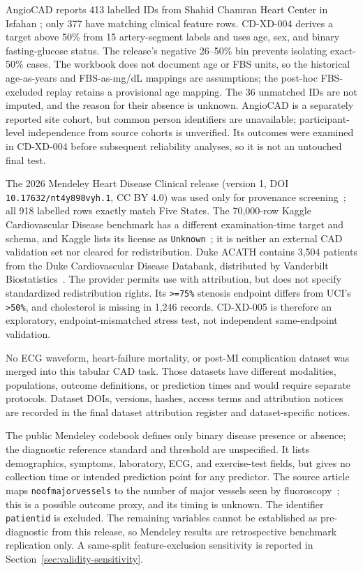 \documentclass[journal]{IEEEtran}
\begin{document}
AngioCAD reports 413 labelled IDs from Shahid Chamran Heart Center in Isfahan
\cite{angiocad2026,angiocadzenodo2025}; only 377 have matching clinical
feature rows. CD-XD-004 derives a target above 50\% from 15 artery-segment
labels and uses age, sex, and binary fasting-glucose status. The release's
negative 26--50\% bin prevents isolating exact-50\% cases. The workbook does
not document age or FBS units, so the historical age-as-years and FBS-as-mg/dL
mappings are assumptions; the post-hoc FBS-excluded replay retains a
provisional age mapping. The 36 unmatched IDs are not imputed, and the reason
for their absence is unknown. AngioCAD is a separately reported site cohort,
but common person identifiers are unavailable; participant-level
independence from source cohorts is unverified. Its outcomes were examined in
CD-XD-004 before subsequent reliability analyses, so it is not an untouched
final test.

The 2026 Mendeley Heart Disease Clinical release (version 1, DOI
\texttt{10.17632/nt4y898vyh.1}, CC BY 4.0) was used only for provenance
screening~\cite{mendeleyheart2026};
all 918 labelled rows exactly match Five States. The 70,000-row Kaggle
Cardiovascular Disease benchmark has a different examination-time target and
schema, and Kaggle lists its license as \texttt{Unknown}~\cite{kagglecardio70k}; it is neither an external
CAD validation set nor cleared for redistribution. Duke ACATH contains 3,504
patients from the Duke Cardiovascular Disease Databank, distributed by
Vanderbilt Biostatistics~\cite{dukeacath2026}. The provider permits use with
attribution, but does not specify standardized redistribution rights. Its
\texttt{>=75\%} stenosis endpoint differs from UCI's \texttt{>50\%}, and
cholesterol is missing in 1,246 records. CD-XD-005 is therefore an
exploratory, endpoint-mismatched stress test, not independent same-endpoint
validation.

No ECG waveform, heart-failure mortality, or post-MI complication dataset was
merged into this tabular CAD task. Those datasets have different modalities,
populations, outcome definitions, or prediction times and would require
separate protocols. Dataset DOIs, versions, hashes, access terms and
attribution notices are recorded in the final dataset attribution register
and dataset-specific notices.

The public Mendeley codebook defines only binary disease presence or absence;
the diagnostic reference standard and threshold are unspecified. It lists
demographics, symptoms, laboratory, ECG, and exercise-test fields, but gives no
collection time or intended prediction point for any predictor. The source
article maps \texttt{noofmajorvessels} to the number of major vessels seen by
fluoroscopy~\cite{doppala2022ensemble}; this is a possible outcome proxy, and
its timing is unknown. The identifier \texttt{patientid} is excluded. The
remaining variables cannot be established as pre-diagnostic from this
release, so Mendeley results are retrospective benchmark replication only.
A same-split feature-exclusion sensitivity is reported in
Section~\ref{sec:validity-sensitivity}.
\end{document}
